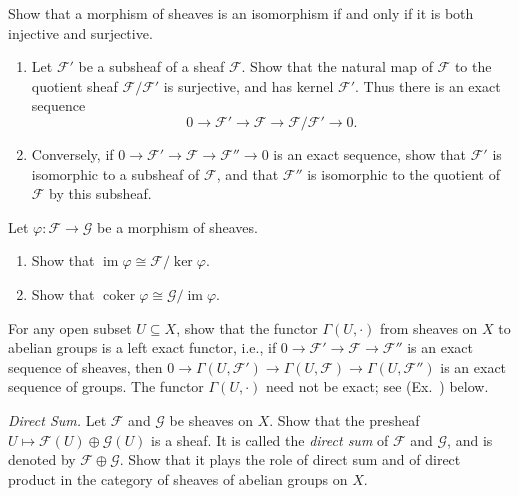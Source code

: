 {\begin{description}[leftmargin=2.4em,labelindent=0pt,topsep=0pt,itemsep=5pt,parsep=0pt]
\item[\hypertarget{ex-II-1.5}{}\textbf{1.5.}] Show that a morphism of sheaves is an isomorphism if and only if it is both injective and surjective.

\item[\hypertarget{ex-II-1.6}{}\textbf{1.6.}]
\begin{enumerate}[label=(\alph*),leftmargin=1.55em,nosep]
\item Let $\mathcal F'$ be a subsheaf of a sheaf $\mathcal F$. Show that the natural map of $\mathcal F$ to the quotient sheaf $\mathcal F/\mathcal F'$ is surjective, and has kernel $\mathcal F'$. Thus there is an exact sequence
\[
0\to\mathcal F'\to\mathcal F\to\mathcal F/\mathcal F'\to0.
\]
\item Conversely, if $0\to\mathcal F'\to\mathcal F\to\mathcal F''\to0$ is an exact sequence, show that $\mathcal F'$ is isomorphic to a subsheaf of $\mathcal F$, and that $\mathcal F''$ is isomorphic to the quotient of $\mathcal F$ by this subsheaf.
\end{enumerate}

\item[\hypertarget{ex-II-1.7}{}\textbf{1.7.}] Let $\varphi\colon\mathcal F\to\mathcal G$ be a morphism of sheaves.
\begin{enumerate}[label=(\alph*),leftmargin=1.55em,nosep]
\item Show that $\operatorname{im}\varphi\cong\mathcal F/\ker\varphi$.
\item Show that $\operatorname{coker}\varphi\cong\mathcal G/\operatorname{im}\varphi$.
\end{enumerate}

\item[\hypertarget{ex-II-1.8}{}\textbf{1.8.}] For any open subset $U\subseteq X$, show that the functor $\Gamma(U,\cdot)$ from sheaves on $X$ to abelian groups is a left exact functor, i.e., if $0\to\mathcal F'\to\mathcal F\to\mathcal F''$ is an exact sequence of sheaves, then $0\to\Gamma(U,\mathcal F')\to\Gamma(U,\mathcal F)\to\Gamma(U,\mathcal F'')$ is an exact sequence of groups. The functor $\Gamma(U,\cdot)$ need not be exact; see (Ex.~) below.

\item[\hypertarget{ex-II-1.9}{}\textbf{1.9.}] \emph{Direct Sum.} Let $\mathcal F$ and $\mathcal G$ be sheaves on $X$. Show that the presheaf $U\mapsto\mathcal F(U)\oplus\mathcal G(U)$ is a sheaf. It is called the \emph{direct sum} of $\mathcal F$ and $\mathcal G$, and is denoted by $\mathcal F\oplus\mathcal G$. Show that it plays the role of direct sum and of direct product in the category of sheaves of abelian groups on $X$.


\end{description}}
